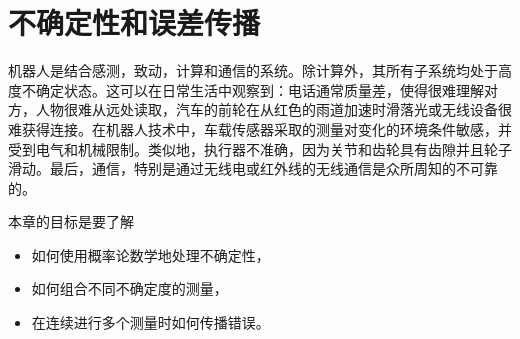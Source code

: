 \chapter{不确定性和误差传播}
\label{chap:uncertainty}



机器人是结合感测，致动，计算和通信的系统。除计算外，其所有子系统均处于高度不确定状态。这可以在日常生活中观察到：电话通常质量差，使得很难理解对方，人物很难从远处读取，汽车的前轮在从红色的雨道加速时滑落光或无线设备很难获得连接。在机器人技术中，车载传感器采取的测量对变化的环境条件敏感，并受到电气和机械限制。类似地，执行器不准确，因为关节和齿轮具有齿隙并且轮子滑动。最后，通信，特别是通过无线电或红外线的无线通信是众所周知的不可靠的。

本章的目标是要了解

\begin{itemize}

\item 如何使用概率论数学地处理不确定性，
\item 如何组合不同不确定度的测量，
\item 在连续进行多个测量时如何传播错误。
\end{itemize}

